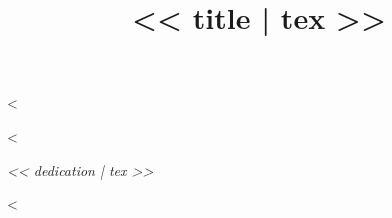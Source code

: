\documentclass[10pt,oneside]{memoir}
\title{<< title | tex >>}
\date{}
\begin{document}
\frontmatter
\begin{titlingpage}
<%
\maketitle
\end{titlingpage}

<%
\movetooddpage
\begin{vplace}
\begin{center}\textit{<< dedication | tex >>}\end{center}
\end{vplace}
<%
\end{document}

